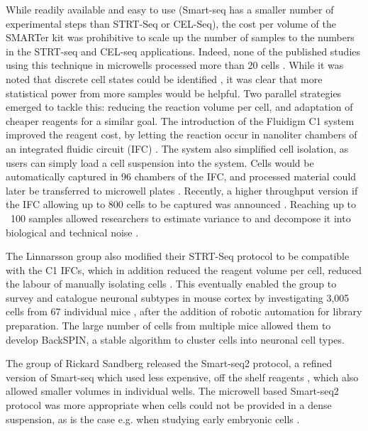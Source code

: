 While readily available and easy to use (Smart-seq has a smaller number of experimental steps than STRT-Seq or CEL-Seq), the cost per volume of the SMARTer kit was prohibitive to scale up the number of samples to the numbers in the STRT-seq and CEL-seq applications. Indeed, none of the published studies using this technique in microwells processed more than 20 cells \cite{Ramskold2012-zc, Marinov2014-bf, Shalek2013-lw}. While it was noted that discrete cell states could be identified \cite{Shalek2013-lw}, it was clear that more statistical power from more samples would be helpful. Two parallel strategies emerged to tackle this: reducing the reaction volume per cell, and adaptation of cheaper reagents for a similar goal. The introduction of the Fluidigm C1 system improved the reagent cost, by letting the reaction occur in nanoliter chambers of an integrated fluidic circuit (IFC) \cite{Fluidigm_Corporation2013-vw}. The system also simplified cell isolation, as users can simply load a cell suspension into the system. Cells would be automatically captured in 96 chambers of the IFC, and processed material could later be transferred to microwell plates \cite{Wu2014-ot, Brennecke2013-vv}. Recently, a higher throughput version if the IFC allowing up to 800 cells to be captured was announced \cite{Fluidigm_Corporation2016-jl}. Reaching up to ~100 samples allowed researchers to estimate variance to and decompose it into biological and technical noise \cite{Brennecke2013-vv, Kim2015-mh}.

The Linnarsson group also modified their STRT-Seq protocol to be compatible with the C1 IFCs, which in addition reduced the reagent volume per cell, reduced the labour of manually isolating cells \cite{Islam2014-dx}. This eventually enabled the group to survey and catalogue neuronal subtypes in mouse cortex by investigating 3,005 cells from 67 individual mice \cite{Zeisel2015-mk}, after the addition of robotic automation for library preparation. The large number of cells from multiple mice allowed them to develop BackSPIN, a stable algorithm to cluster cells into neuronal cell types.

The group of Rickard Sandberg released the Smart-seq2 protocol, a refined version of Smart-seq which used less expensive, off the shelf reagents \cite{Picelli2013-px, Picelli2014-hr}, which also allowed smaller volumes in individual wells. The microwell based Smart-seq2 protocol was more appropriate when cells could not be provided in a dense suspension, as is the case e.g. when studying early embryonic cells \cite{Deng2014-ud}.

